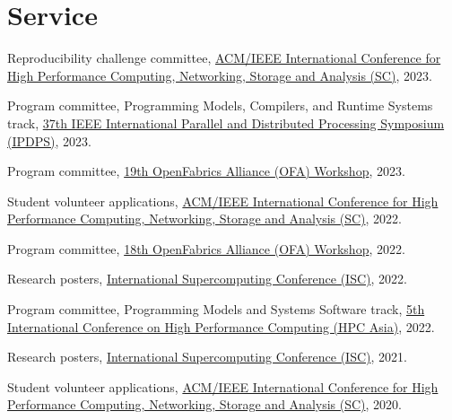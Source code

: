 \documentclass[11pt,article,oneside]{memoir}
\begin{document}
\bigskip

\section{Service}

\medskip

\ind Reproducibility challenge committee, \href{https://sc23.supercomputing.org/}{ACM/IEEE International Conference for High Performance Computing, Networking, Storage and Analysis (SC)}, 2023.
\vspace{0.01in}

\ind Program committee, Programming Models, Compilers, and Runtime Systems track, \href{https://www.ipdps.org/ipdps2023}{37th IEEE International Parallel and Distributed Processing Symposium (IPDPS)}, 2023.
\vspace{0.01in}

\ind Program committee, \href{https://www.openfabrics.org/2023-ofa-workshop/}{19th OpenFabrics Alliance (OFA) Workshop}, 2023.
\vspace{0.01in}

\ind Student volunteer applications, \href{https://sc22.supercomputing.org/}{ACM/IEEE International Conference for High Performance Computing, Networking, Storage and Analysis (SC)}, 2022.
\vspace{0.01in}

\ind Program committee, \href{https://www.openfabrics.org/2022-ofa-workshop/}{18th OpenFabrics Alliance (OFA) Workshop}, 2022.
\vspace{0.01in}

\ind Research posters, \href{https://www.isc-hpc.com/isc-committees.html}{International Supercomputing Conference (ISC)}, 2022.
\vspace{0.01in}

\ind Program committee, Programming Models and Systems Software track, \href{http://sighpc.ipsj.or.jp/HPCAsia2022/}{5th International Conference on High Performance Computing (HPC Asia)}, 2022.
\vspace{0.01in}

\ind Research posters, \href{https://www.isc-hpc.com/isc-committees.html}{International Supercomputing Conference (ISC)}, 2021.
\vspace{0.01in}

\ind Student volunteer applications, \href{https://sc20.supercomputing.org/}{ACM/IEEE International Conference for High Performance Computing, Networking, Storage and Analysis (SC)}, 2020.
\end{document}
